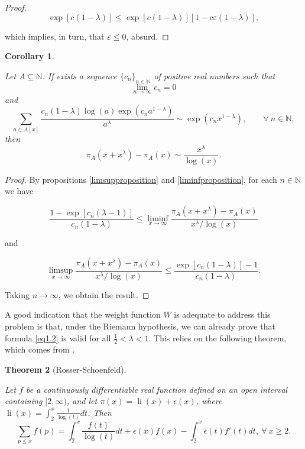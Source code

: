 \documentclass[11pt]{amsart}
\newtheorem{theorem}{Theorem}[section]
\newtheorem{corollary}[theorem]{Corollary}
\numberwithin{equation}{section}
\newcommand{\N}{\mathbb{N}}
\DeclareMathOperator{\li}{li}
\newcommand{\disum}{\displaystyle \sum}
\newcommand{\diint}{\displaystyle \int}
\newcommand{\dilim}{\displaystyle \lim}
\newcommand{\difrac}{\displaystyle \frac}
\newcommand{\diliminf}{\displaystyle \liminf}
\newcommand{\dilimsup}{\displaystyle \limsup}
\begin{document}
\begin{proof}
\vspace{-3mm}

$$\exp[c(1 - \lambda)] \leq \exp[c(1 - \lambda)][1 - c\varepsilon(1 - \lambda)],$$

\vspace{1mm}

\noindent which implies, in turn, that $\varepsilon \leq 0$, absurd. \end{proof}

\begin{corollary} \label{abstractmainresult}

Let $A \subseteq \N$. If exists a sequence $\{c_n\}_{n \in \N}$ of positive real numbers such that $$\dilim_{n \to \infty} c_n = 0$$ and $$\disum_{a \in A[x]} \difrac{c_n(1 - \lambda)\log(a)\exp(c_n a^{1 - \lambda})}{a^{\lambda}} \sim \exp(c_n x^{1 - \lambda}), \qquad \forall \ n \in \N,$$ then $$\pi_A(x + x^\lambda) - \pi_A(x) \sim \difrac{x^\lambda}{\log(x)}.$$

\end{corollary}

\begin{proof} By propositions \ref{limsupproposition} and \ref{liminfproposition}, for each $n \in \N$ we have

$$\difrac{1-\exp[c_n(\lambda - 1)]}{c_n(1 - \lambda)} \leq \diliminf_{x \to \infty} \difrac{\pi_A(x + x^\lambda) - \pi_A(x)}{x^\lambda/\log(x)}$$

\noindent and

$$\dilimsup_{x \to \infty} \difrac{\pi_A(x + x^\lambda) - \pi_A(x)}{x^\lambda/\log(x)} \leq \difrac{\exp[c_n(1 - \lambda)] - 1}{c_n(1 - \lambda)}.$$

\noindent Taking $n \to \infty$, we obtain the result. \end{proof}

A good indication that the weight function $W$ is adequate to address this problem is that, under the Riemann hypothesis, we can already prove that formula \ref{eq1.2} is valid for all $\difrac{1}{2} < \lambda < 1$. This relies on the following theorem, which comes from \cite{RS}.

\begin{theorem} [Rosser-Schoenfeld] \label{RS}

Let $f$ be a continuously differentiable real function defined on an open interval containing $[2, \infty)$, and let $\pi(x) = \li(x) + \epsilon(x)$, where $\li(x) = \diint_{2}^{x} \difrac{1}{\log(t)} dt$. Then $$\disum_{p \leq x} f(p) = \diint_{2}^{x} \difrac{f(t)}{\log(t)} dt + \epsilon(x)f(x) - \diint_{2}^{x} \epsilon(t)f'(t) dt, \ \forall \ x \geq 2.$$

\end{theorem}
\end{document}
